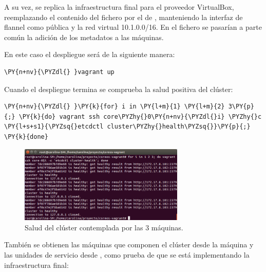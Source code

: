 A su vez, se replica la infraestructura final para el proveedor VirtualBox, reemplazando el contenido del fichero  por el de , manteniendo la interfaz de flannel como pública y la red virtual 10.1.0.0/16. En el fichero  se pasarían a parte común la adición de los metadatos a las máquinas.

En este caso el despliegue será de la siguiente manera:

\begin{framed_shaded}
\begin{Verbatim}[fontsize=\relsize{-2.5},fontseries=b,commandchars=\\\{\}]
\PY{n+nv}{\PYZdl{} }vagrant up 
\end{Verbatim}
\end{framed_shaded}

Cuando el despliegue termina se comprueba la salud positiva del clúster:

\begin{framed_shaded}
\begin{Verbatim}[fontsize=\relsize{-2.5},fontseries=b,commandchars=\\\{\}]
\PY{n+nv}{\PYZdl{} }\PY{k}{for} i in \PY{l+m}{1} \PY{l+m}{2} 3\PY{p}{;} \PY{k}{do} vagrant ssh core\PYZhy{}0\PY{n+nv}{\PYZdl{}i} \PYZhy{}c \PY{l+s+s1}{\PYZsq{}etcdctl cluster\PYZhy{}health\PYZsq{}}\PY{p}{;} \PY{k}{done}
\end{Verbatim}
\end{framed_shaded}

\begin{figure}[H]
\centering
\includegraphics[width=0.7\textwidth]{images/figures/health-vbox.png}
\caption{Salud del clúster contemplada por las 3 máquinas.}
\end{figure}

También se obtienen las máquinas que componen el clúster desde la máquina  y las unidades de servicio desde , como prueba de que se está implementando la infraestructura final:

